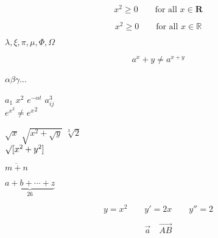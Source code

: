 \documentclass[a4paper,11pt]{book}
\begin{document}
	\begin{equation}
	x^{2} \geq 0\qquad
	\textrm{for all }x\in\mathbf{R}
	\end{equation}
	
	\begin{displaymath}
	x^{2} \geq 0\qquad
	\textrm{for all }x\in\mathbb{R}
	\end{displaymath}
	
	$\lambda,\xi,\pi,\mu,\Phi,\Omega$
	
	
	\begin{equation}
	a^x+y \neq a^{x+y}
	\end{equation}
	
	$\alpha \beta \gamma$...
	
	$a_{1}$ \qquad $x^{2}$ \qquad
	$e^{-\alpha t}$ \qquad
	$a^{3}_{ij}$\\
	$e^{x^2} \neq {e^x}^2$
	
	$\sqrt{x}$ \qquad
	$\sqrt{ x^{2}+\sqrt{y} }$
	\qquad $\sqrt[3]{2}$\\[3pt]
	$\surd[x^2 + y^2]$
	
	$\overline{m+n}$
	
	$\underbrace{a+b+\cdots+z}_{26}$
	
	
	\begin{displaymath}
	y=x^{2}\qquad y'=2x\qquad y''=2
	\end{displaymath}
	
	
	\begin{displaymath}
	\vec a\quad\overrightarrow{AB}
	\end{displaymath}
	
	
	
\end{document}
